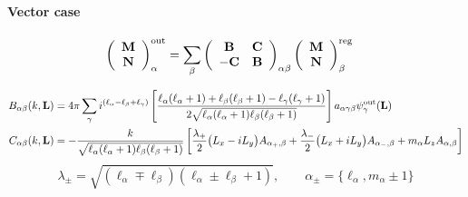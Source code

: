\documentclass[letterpaper]{article}
\begin{document}

\paragraph{Vector case}

\begin{align*}
 \left(\begin{array}{c}
   \mathbf{M} \\ \mathbf{N}
 \end{array}\right)^{\text{\scriptsize out}}_\alpha
&= 
 \sum_{\beta}
 \left(\begin{array}{cc}
   \mathbf{B} & \mathbf{C} \\ 
  -\mathbf{C} & \mathbf{B}
 \end{array}\right)_{\alpha\beta} 
 \left(\begin{array}{c}
   \mathbf{M} \\ \mathbf{N} 
 \end{array}\right)^{\text{\scriptsize reg}}_\beta
\end{align*}

\begin{align*}
 B_{\alpha\beta}(k, \mathbf{L})
&=4\pi 
  \sum_\gamma i^{(\ell_\alpha - \ell_\beta + \ell_\gamma)}
  \left[\frac{\ell_\alpha(\ell_\alpha + 1) + \ell_\beta(\ell_\beta + 1) 
               -\ell_\gamma(\ell_\gamma+ 1)
             }
             {2\sqrt{\ell_\alpha(\ell_\alpha+1)\ell_\beta (\ell_\beta+1)}}
  \right]
  a_{\alpha\gamma\beta} 
  \psi^{\text{\scriptsize out}}_\gamma(\mathbf{L})
\\
 C_{\alpha\beta}(k, \mathbf{L})
&=-\frac{k}{\sqrt{\ell_\alpha(\ell_\alpha+1)\ell_\beta(\ell_\beta+1)}}
   \left[ \frac{\lambda_+}{2}\big(L_x - iL_y\big)A_{\alpha_+, \beta} 
         +\frac{\lambda_-}{2}\big(L_x + iL_y\big)A_{\alpha_-, \beta} 
         +           m_\alpha L_z A_{\alpha, \beta} 
   \right]
\end{align*}
$$ \lambda_\pm = \sqrt{ (\ell_\alpha \mp \ell_\beta)
                        (\ell_\alpha \pm \ell_\beta+1)
                      },
   \qquad
   \alpha_\pm = \{\ell_\alpha, m_\alpha \pm 1\}
$$

\newpage
\end{document}
